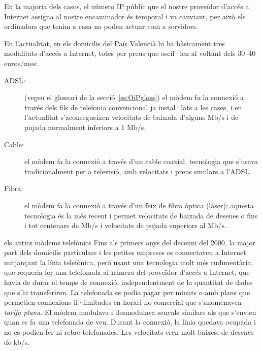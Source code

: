 En la majoria dels casos, el número IP públic que el nostre proveïdor
d'accés a Internet assigna al nostre encaminador és temporal i va
canviant, per això els ordinadors que tenim a casa no poden actuar com
a servidors.

En l'actualitat, en els domicilis del País Valencià hi ha bàsicament
tres modalitats d'accés a Internet, totes per preus que oscil·len al
voltant dels 30--40 euros/mes:
\begin{description}
\item[ADSL:] (vegeu el glossari de la secció~\ref{ss:OiPgloss}) el
  mòdem fa la connexió a través dels fils de telefonia convencional ja
  instal·lats a les cases, i en l'actualitat s'aconsegueixen
  velocitats de baixada d'alguns Mb/s i de pujada normalment inferiors
  a 1 Mb/s.
\item[Cable:] el mòdem fa la connexió a través d'un cable coaxial,
  tecnologia que s'usava tradicionalment per a televisió, amb
  velocitats i preus similars a l'ADSL.
\item[Fibra:] el mòdem fa la connexió a través d'un feix de fibra
  òptica (làser); aquesta tecnologia és la més recent i permet
  velocitats de baixada de desenes o fins i tot centenars de Mb/s i
  velocitats de pujada superiors al Mb/s.
\end{description}

\begin{persabermes}{els antics mòdems telefònics}
  Fins als primers anys del decenni del 2000, la major part dels
  domicilis particulars i les petites empreses es connectaven a
  Internet mitjançant la línia telefònica, però usant una tecnologia
  molt més rudimentària, que requeria fer una telefonada al número del
  proveïdor d'accés a Internet, que havia de durar el temps de
  connexió, independentment de la quantitat de dades que s'hi
  transferiren. La telefonada es podia pagar per minuts o amb plans
  que permetien connexions il·limitades en horari no comercial que
  s'anomenaven \emph{tarifa plana}. El mòdem modulava i desmodulava
  senyals similars als que s'envien quan es fa una telefonada de
  veu. Durant la connexió, la línia quedava ocupada i no es podien fer
  ni rebre telefonades. Les velocitats eren molt baixes, de desenes de
  kb/s.
\end{persabermes}


